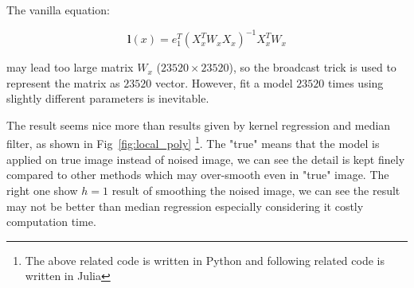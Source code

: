 \documentclass{article}
\begin{document}
The vanilla equation:

$$
\mathbf{l}(x) = e_1^T (X_x^T W_x X_x)^{-1} X_x^T W_x
$$

may lead too large matrix $W_x$ ($23520 \times 23520$), so the broadcast trick is used to represent the matrix as 
$23520$ vector. However, fit a model $23520$ times using slightly different parameters is inevitable. 

The result seems nice more than results given by kernel regression and median filter, 
as shown in Fig~\ref{fig:local_poly} 
\footnote{The above related code is written in Python and following related code is written in Julia}.  
The "true" means that the model is applied on true image instead of noised image,
we can see the detail is kept finely compared to other methods which may over-smooth even in "true" image.
The right one show $h=1$ result of smoothing the noised image, we can see the result may not be better than median regression especially considering
it costly computation time. 
\end{document}
